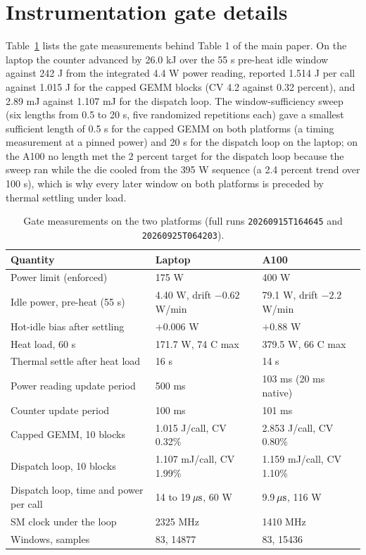 \appendix
\section{Instrumentation gate details}
\label{app:gate}

Table~\ref{tab:gate_detail} lists the gate measurements behind Table 1 of the main paper. On the laptop the counter advanced by 26.0 kJ over the 55 s pre-heat idle window against 242 J from the integrated 4.4 W power reading, reported 1.514 J per call against 1.015 J for the capped GEMM blocks (CV 4.2 against 0.32 percent), and 2.89 mJ against 1.107 mJ for the dispatch loop. The window-sufficiency sweep (six lengths from 0.5 to 20 s, five randomized repetitions each) gave a smallest sufficient length of 0.5 s for the capped GEMM on both platforms (a timing measurement at a pinned power) and 20 s for the dispatch loop on the laptop; on the A100 no length met the 2 percent target for the dispatch loop because the sweep ran while the die cooled from the 395 W sequence (a 2.4 percent trend over 100 s), which is why every later window on both platforms is preceded by thermal settling under load.

\begin{table}[h]
\caption{Gate measurements on the two platforms (full runs \texttt{20260915T164645} and \texttt{20260925T064203}).}
\label{tab:gate_detail}
\vskip 0.1in
\centering
\footnotesize
\begin{tabular}{@{}p{3.3cm}p{2.3cm}p{2.3cm}@{}}
\toprule
Quantity & Laptop & A100 \\
\midrule
Power limit (enforced) & 175 W & 400 W \\
Idle power, pre-heat (55 s) & 4.40 W, drift $-0.62$ W/min & 79.1 W, drift $-2.2$ W/min \\
Hot-idle bias after settling & $+0.006$ W & $+0.88$ W \\
Heat load, 60 s & 171.7 W, 74 C max & 379.5 W, 66 C max \\
Thermal settle after heat load & 16 s & 14 s \\
Power reading update period & 500 ms & 103 ms (20 ms native) \\
Counter update period & 100 ms & 101 ms \\
Capped GEMM, 10 blocks & 1.015 J/call, CV 0.32\% & 2.853 J/call, CV 0.80\% \\
Dispatch loop, 10 blocks & 1.107 mJ/call, CV 1.99\% & 1.159 mJ/call, CV 1.10\% \\
Dispatch loop, time and power per call & 14 to 19$\,\mu\mathrm{s}$, 60 W & 9.9$\,\mu\mathrm{s}$, 116 W \\
SM clock under the loop & 2325 MHz & 1410 MHz \\
Windows, samples & 83, 14877 & 83, 15436 \\
\bottomrule
\end{tabular}
\end{table}

